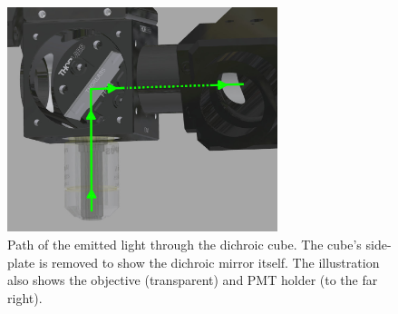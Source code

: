 \documentclass[a4paper]{report}
\begin{document}
\begin{figure}[h]
\center
\includegraphics[width=3.1in]{cube_emission_cutout.eps}
\caption{Path of the emitted light through the dichroic cube. The cube's side-plate is removed to show the dichroic mirror itself. The illustration also shows the objective (transparent) and PMT holder (to the far right).}
\label{fig:dichroic_holder_paths}
\end{figure}
\end{document}
